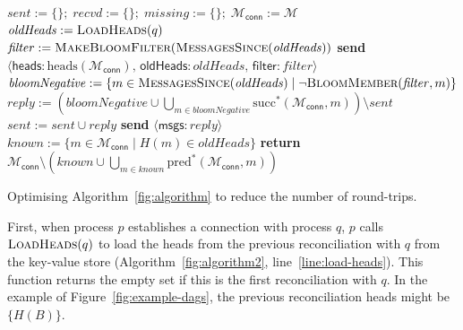 \documentclass[a4paper,anonymous,USenglish]{lipics-v2019}
\begin{document}
\begin{algorithm}[t]
    \begin{algorithmic}[1]
        \State $\mathit{sent} := \{\};\; \mathit{recvd} := \{\};\; \mathit{missing} := \{\};\; \mathcal{M}_\mathsf{conn} := \mathcal{M}$ 
        \State $\mathit{oldHeads} := \Call{LoadHeads}{q}$\label{line:load-heads}
        \State $\mathit{filter} := \textsc{MakeBloomFilter}(\Call{MessagesSince}{\mathit{oldHeads}})$\label{line:make-bloom}
        \State \textbf{send} $\langle\mathsf{heads}: \mathrm{heads}(\mathcal{M}_\mathsf{conn}),\, \mathsf{oldHeads}: \mathit{oldHeads},\, \mathsf{filter}: \mathit{filter}\rangle$ \label{line:a2-send-heads}
    \EndOn
    \State
    \label{line:a2-recv-heads}
        \State $\mathit{bloomNegative} := \{m \in \Call{MessagesSince}{\mathit{oldHeads}} \mid \neg\Call{BloomMember}{\mathit{filter}, m}\}$\label{line:bloom-member}
        \State $\mathit{reply} := \left(\mathit{bloomNegative} \cup \bigcup_{m \in \mathit{bloomNegative}} \mathrm{succ}^*(\mathcal{M}_\mathsf{conn}, m)\right) \setminus \mathit{sent}$\label{line:bloom-succ}
            \State $\mathit{sent} := \mathit{sent} \cup \mathit{reply}$
            \State \textbf{send} $\langle\mathsf{msgs}: \mathit{reply}\rangle$ \label{line:a2-heads-reply}
        \EndIf
        \State {} \label{line:a2-heads-missing}
    \EndOn
    \State
        \State $\mathit{known} := \{m \in \mathcal{M}_\mathsf{conn} \mid H(m) \in \mathit{oldHeads}\}$
        \State \textbf{return} $\mathcal{M}_\mathsf{conn} \setminus \left(\mathit{known} \cup \bigcup_{m \in \mathit{known}} \mathrm{pred}^*(\mathcal{M}_\mathsf{conn}, m)\right)$
    \EndFunction
    \end{algorithmic}
    \caption{Optimising Algorithm~\ref{fig:algorithm} to reduce the number of round-trips.}\label{fig:algorithm2}
\end{algorithm}

First, when process $p$ establishes a connection with process $q$, $p$ calls $\textsc{LoadHeads}(q)$ to load the heads from the previous reconciliation with $q$ from the key-value store (Algorithm~\ref{fig:algorithm2}, line~\ref{line:load-heads}).
This function returns the empty set if this is the first reconciliation with $q$.
In the example of Figure~\ref{fig:example-dags}, the previous reconciliation heads might be $\{H(B)\}$.
\end{document}
